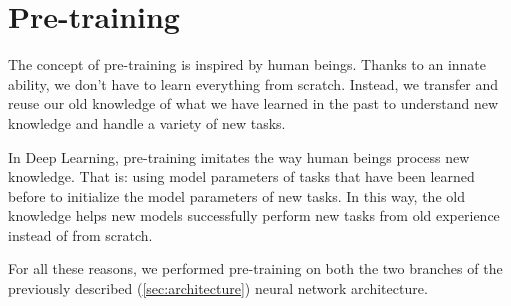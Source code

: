 \section{Pre-training}\label{sec:pre_training}
The concept of pre-training is inspired by human beings. Thanks to an innate ability, we don’t have to learn everything from scratch. Instead, we transfer and reuse our old knowledge of what we have learned in the past to understand new knowledge and handle a variety of new tasks.

In Deep Learning, pre-training imitates the way human beings process new knowledge. That is: using model parameters of tasks that have been learned before to initialize the model parameters of new tasks. In this way, the old knowledge helps new models successfully perform new tasks from old experience instead of from scratch.

For all these reasons, we performed pre-training on both the two branches of the previously described (\vref{sec:architecture}) neural network architecture.








